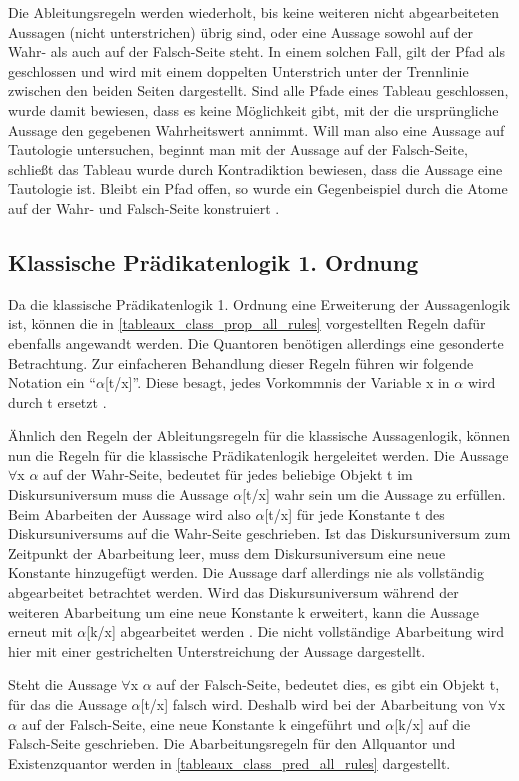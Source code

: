 Die Ableitungsregeln werden wiederholt, bis keine weiteren nicht abgearbeiteten Aussagen (nicht unterstrichen) übrig sind, oder eine Aussage sowohl auf der Wahr- als auch auf der Falsch-Seite steht. In einem solchen Fall, gilt der Pfad als geschlossen und wird mit einem doppelten Unterstrich unter der Trennlinie zwischen den beiden Seiten dargestellt. Sind alle Pfade eines Tableau geschlossen, wurde damit bewiesen, dass es keine Möglichkeit gibt, mit der die ursprüngliche Aussage den gegebenen Wahrheitswert annimmt. Will man also eine Aussage auf Tautologie untersuchen, beginnt man mit der Aussage auf der Falsch-Seite, schließt das Tableau wurde durch Kontradiktion bewiesen, dass die Aussage eine Tautologie ist. Bleibt ein Pfad offen, so wurde ein Gegenbeispiel durch die Atome auf der Wahr- und Falsch-Seite konstruiert \cite{KB14}.

\subsection{\label{tableaux_classic_pred}Klassische Prädikatenlogik 1. Ordnung}
Da die klassische Prädikatenlogik 1. Ordnung eine Erweiterung der Aussagenlogik ist, können die in \autoref{tableaux_class_prop_all_rules} vorgestellten Regeln dafür ebenfalls angewandt werden. Die Quantoren benötigen allerdings eine gesonderte Betrachtung. Zur einfacheren Behandlung dieser Regeln führen wir folgende Notation ein ``$\alpha$[t/x]''. Diese besagt, jedes Vorkommnis der Variable x in $\alpha$ wird durch t ersetzt \cite{DGHP99}.

Ähnlich den Regeln der Ableitungsregeln für die klassische Aussagenlogik, können nun die Regeln für die klassische Prädikatenlogik hergeleitet werden. Die Aussage $\forall$x $\alpha$ auf der Wahr-Seite, bedeutet für jedes beliebige Objekt t im Diskursuniversum muss die Aussage $\alpha$[t/x] wahr sein um die Aussage zu erfüllen. Beim Abarbeiten der Aussage wird also $\alpha$[t/x] für jede Konstante t des Diskursuniversums auf die Wahr-Seite geschrieben. Ist das Diskursuniversum zum Zeitpunkt der Abarbeitung leer, muss dem Diskursuniversum eine neue Konstante hinzugefügt werden. Die Aussage darf allerdings nie als vollständig abgearbeitet betrachtet werden. Wird das Diskursuniversum während der weiteren Abarbeitung um eine neue Konstante k erweitert, kann die Aussage erneut mit $\alpha$[k/x] abgearbeitet werden \cite{KB14}. Die nicht vollständige Abarbeitung wird hier mit einer gestrichelten Unterstreichung der Aussage dargestellt.

Steht die Aussage $\forall$x $\alpha$ auf der Falsch-Seite, bedeutet dies, es gibt ein Objekt t, für das die Aussage $\alpha$[t/x] falsch wird. Deshalb wird bei der Abarbeitung von $\forall$x $\alpha$ auf der Falsch-Seite, eine neue Konstante k eingeführt und $\alpha$[k/x] auf die Falsch-Seite geschrieben. Die Abarbeitungsregeln für den Allquantor und Existenzquantor werden in \autoref{tableaux_class_pred_all_rules} dargestellt.

